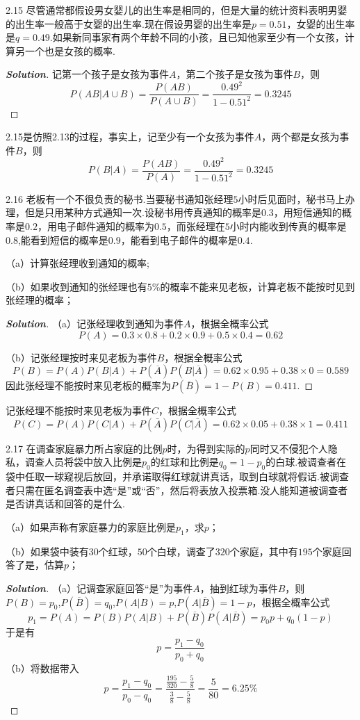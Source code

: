 \documentclass[10pt, a4paper, oneside]{ctexart}
\newenvironment{solution}{\begin{proof}[\bf Solution]}{\end{proof}}
\begin{document}
2.15 尽管通常都假设男女婴儿的出生率是相同的，但是大量的统计资料表明男婴的出生率一般高于女婴的出生率.现在假设男婴的出生率是$p=0.51$，女婴的出生率是$q=0.49$.如果新同事家有两个年龄不同的小孩，且已知他家至少有一个女孩，计算另一个也是女孩的概率.
\begin{solution}
记第一个孩子是女孩为事件$A$，第二个孩子是女孩为事件$B$，则
\[P(AB|A \cup B) = \frac{{P(AB)}}{{P(A \cup B)}} = \frac{{{{0.49}^2}}}{{1 - {{0.51}^2}}} = 0.3245\]
\end{solution}
\begin{remark}
2.15是仿照2.13的过程，事实上，记至少有一个女孩为事件$A$，两个都是女孩为事件$B$，则
\[P(B|A) = \frac{{P(AB)}}{{P(A)}} = \frac{{{{0.49}^2}}}{{1 - {{0.51}^2}}} = 0.3245\]
\end{remark}

2.16 老板有一个不很负责的秘书.当要秘书通知张经理$5$小时后见面时，秘书马上办理，但是只用某种方式通知一次.设秘书用传真通知的概率是$0.3$，用短信通知的概率是$0.2$，用电子邮件通知的概率为$0.5$，而张经理在$5$小时内能收到传真的概率是$0.8$,能看到短信的概率是$0.9$，能看到电子邮件的概率是$0.4$.

（a）计算张经理收到通知的概率;

（b）如果收到通知的张经理也有$5$\%的概率不能来见老板，计算老板不能按时见到张经理的概率；
\begin{solution}
（a）记张经理收到通知为事件$A$，根据全概率公式
\[P(A) = 0.3 \times 0.8 + 0.2 \times 0.9 + 0.5 \times 0.4 = 0.62\]

（b）记张经理按时来见老板为事件$B$，根据全概率公式
\[P(B) = P(A)P(B|A) + P(\overline A )P(B|\overline A ) = 0.62 \times 0.95 + 0.38 \times 0 = 0.589\]
因此张经理不能按时来见老板的概率为$P(\overline{B})=1-P(B)=0.411$.
\end{solution}
\begin{remark}
记张经理不能按时来见老板为事件$C$，根据全概率公式
\[P(C) = P(A)P(C|A) + P(\bar A)P(C|\bar A) = 0.62 \times 0.05 + 0.38 \times 1 = 0.411\]
\end{remark}

2.17 在调查家庭暴力所占家庭的比例$p$时，为得到实际的$p$同时又不侵犯个人隐私，调查人员将袋中放入比例是$p_0$的红球和比例是$q_0=1-p_0$的白球.被调查者在袋中任取一球窥视后放回，并承诺取得红球就讲真话，取到白球就将假话.被调查者只需在匿名调查表中选“是”或“否”，然后将表放入投票箱.没人能知道被调查者是否讲真话和回答的是什么.

（a）如果声称有家庭暴力的家庭比例是$p_1$，求$p$；

（b）如果袋中装有$30$个红球，$50$个白球，调查了$320$个家庭，其中有$195$个家庭回答了是，估算$p$；
\begin{solution}
（a）记调查家庭回答“是”为事件$A$，抽到红球为事件$B$，则$P(B)=p_0$,$P(\overline{B})=q_0$,$P(A|B)=p$,$P(A|\overline{B})=1-p$，根据全概率公式
\[{p_1} = P(A) = P(B)P(A|B) + P(\overline B )P(A|\overline B ) = {p_0}p + {q_0}(1 - p)\]
于是有
\[p = \frac{{{p_1} - {q_0}}}{{{p_0} + {q_0}}}\]
（b）将数据带入
\[p = \frac{{{p_1} - {q_0}}}{{{p_0} - {q_0}}} = \frac{{\frac{{195}}{{320}} - \frac{5}{8}}}{{\frac{3}{8} - \frac{5}{8}}} = \frac{5}{{80}} = 6.25\% \]
\end{solution}
\end{document}
